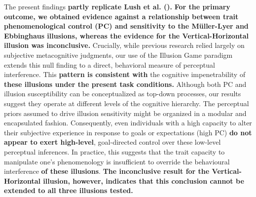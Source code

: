 \documentclass[
  man,
  floatsintext,
  longtable,
  nolmodern,
  notxfonts,
  notimes,
  colorlinks=true,linkcolor=blue,citecolor=blue,urlcolor=blue]{apa7}
\begin{document}
The present findings \textbf{partly replicate Lush et al.
().} \textbf{For the primary outcome, we
obtained evidence against a relationship between trait phenomenological
control (PC) and sensitivity to the Müller-Lyer and Ebbinghaus
illusions, whereas the evidence for the Vertical-Horizontal illusion was
inconclusive.} Crucially, while previous research relied largely on
subjective metacognitive judgments, our use of the Illusion Game
paradigm extends this null finding to a direct, behavioral measure of
perceptual interference. This \textbf{pattern is consistent with} the
cognitive impenetrability of \textbf{these illusions under the present
task conditions.} Although both PC and illusion susceptibility can be
conceptualized as top-down processes, our results suggest they operate
at different levels of the cognitive hierarchy. The perceptual priors
assumed to drive illusion sensitivity might be organized in a modular
and encapsulated fashion. Consequently, even individuals with a high
capacity to alter their subjective experience in response to goals or
expectations (high PC) \textbf{do not appear to exert high-level},
goal-directed control over these low-level perceptual inferences. In
practice, this suggests that the trait capacity to manipulate one's
phenomenology is insufficient to override the behavioural interference
\textbf{of these illusions}. \textbf{The inconclusive result for the
Vertical-Horizontal illusion, however, indicates that this conclusion
cannot be extended to all three illusions tested.}
\end{document}
